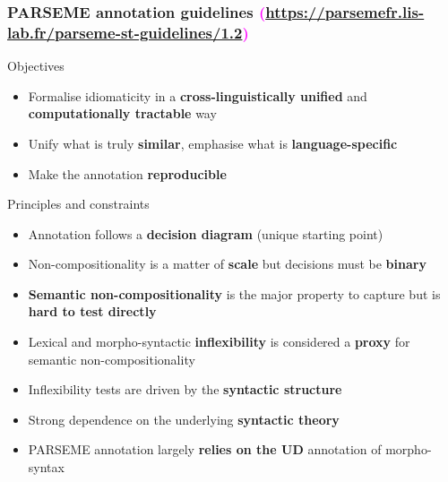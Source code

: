 \documentclass[xcolor=dvipsnames]{beamer}
\begin{document}
\begin{frame}
  \frametitle{PARSEME annotation guidelines \textcolor{magenta}{{\scriptsize (\url{https://parsemefr.lis-lab.fr/parseme-st-guidelines/1.2})}}}

\begin{scriptsize}

\vspace{-0.2cm}

\begin{block}{Objectives} 
\begin{itemize}
\item Formalise idiomaticity in a \textbf{cross-linguistically unified} and \textbf{computationally tractable} way
\item Unify what is truly \textbf{similar}, emphasise what is \textbf{language-specific}
\item Make the annotation \textbf{reproducible}
\end{itemize}
\end{block}

\vspace{-0.2cm}

\begin{block}{Principles and constraints} 
\begin{itemize}
\item Annotation follows a \textbf{decision diagram} (unique starting point)
\item Non-compositionality is a matter of \textbf{scale} but decisions must be \textbf{binary}
\item \textbf{Semantic non-compositionality} is the major property to capture but is \textbf{hard to test directly}
\item Lexical and morpho-syntactic \textbf{inflexibility} is considered a \textbf{proxy} for semantic non-compositionality
\item Inflexibility tests are driven by the \textbf{syntactic structure}
\item Strong dependence on the underlying \textbf{syntactic theory}
\item PARSEME annotation largely \textbf{relies on the UD} annotation of morpho-syntax
\end{itemize}
\end{block}

\end{scriptsize}

\end{frame}
\end{document}
